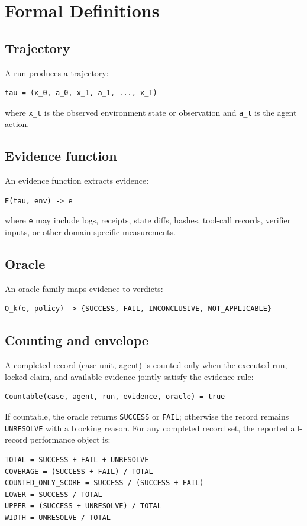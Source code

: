 \documentclass{article}
\begin{document}
\section{Formal Definitions}

\subsection{Trajectory}

A run produces a trajectory:
\begin{lstlisting}
tau = (x_0, a_0, x_1, a_1, ..., x_T)
\end{lstlisting}
where \texttt{x\_t} is the observed environment state or observation and
\texttt{a\_t} is the agent action.

\subsection{Evidence function}

An evidence function extracts evidence:
\begin{lstlisting}
E(tau, env) -> e
\end{lstlisting}
where \texttt{e} may include logs, receipts, state diffs, hashes, tool-call
records, verifier inputs, or other domain-specific measurements.

\subsection{Oracle}

An oracle family maps evidence to verdicts:
\begin{lstlisting}
O_k(e, policy) -> {SUCCESS, FAIL, INCONCLUSIVE, NOT_APPLICABLE}
\end{lstlisting}

\subsection{Counting and envelope}

A completed record (case unit, agent) is counted only when the executed run,
locked claim, and available evidence jointly satisfy the evidence rule:
\begin{lstlisting}
Countable(case, agent, run, evidence, oracle) = true
\end{lstlisting}
If countable, the oracle returns \texttt{SUCCESS} or \texttt{FAIL}; otherwise
the record remains \texttt{UNRESOLVE} with a blocking reason. For any completed
record set, the reported all-record performance object is:
\begin{lstlisting}
TOTAL = SUCCESS + FAIL + UNRESOLVE
COVERAGE = (SUCCESS + FAIL) / TOTAL
COUNTED_ONLY_SCORE = SUCCESS / (SUCCESS + FAIL)
LOWER = SUCCESS / TOTAL
UPPER = (SUCCESS + UNRESOLVE) / TOTAL
WIDTH = UNRESOLVE / TOTAL
\end{lstlisting}
\end{document}

